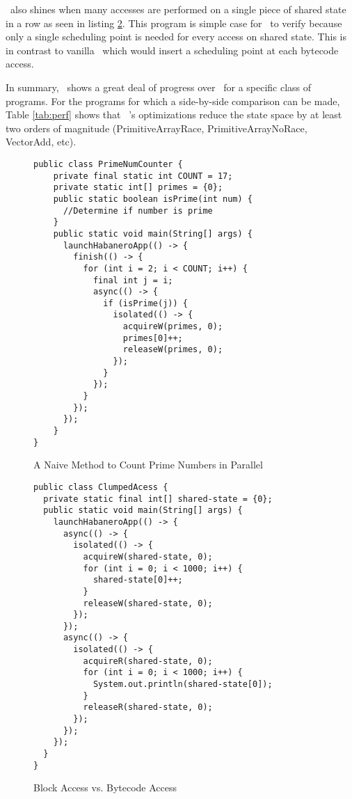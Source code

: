 \jpfhj\ also shines when many accesses are performed on a single piece of shared
state in a row as seen in listing \ref{lst:clumped}. This program is simple case
for \jpfhj\ to verify because only a single scheduling point is needed for every
access on shared state. This is in contrast to vanilla \jpf\ which would
insert a scheduling point at each bytecode access. 

In summary, \jpfhj\ shows a great deal of progress over \jpf\ for a specific
class of programs. For the programs for which a side-by-side comparison can be
made, Table \ref{tab:perf} shows that \jpfhj\ 's optimizations reduce the state
space by at least two orders of magnitude (PrimitiveArrayRace,
PrimitiveArrayNoRace, VectorAdd, etc).


\begin{figure}[t]
    \begin{center}
    \begin{lstlisting}
public class PrimeNumCounter {
    private final static int COUNT = 17;
    private static int[] primes = {0};
    public static boolean isPrime(int num) {
      //Determine if number is prime
    }
    public static void main(String[] args) {
      launchHabaneroApp(() -> {
        finish(() -> {
          for (int i = 2; i < COUNT; i++) {
            final int j = i;
            async(() -> {
              if (isPrime(j)) {
                isolated(() -> {
                  acquireW(primes, 0);
                  primes[0]++;
                  releaseW(primes, 0);
                });
              }
            });
          }
        });
      });
    }
}
    \end{lstlisting}
    \end{center}
    \caption{A Naive Method to Count Prime Numbers in Parallel}
    \label{lst:prime-num-counter}
\end{figure}

\begin{figure}[t]
    \begin{center}
    \begin{lstlisting}
public class ClumpedAcess {
  private static final int[] shared-state = {0};
  public static void main(String[] args) {
    launchHabaneroApp(() -> {
      async(() -> {
        isolated(() -> {
          acquireW(shared-state, 0);
          for (int i = 0; i < 1000; i++) {
            shared-state[0]++;
          }
          releaseW(shared-state, 0);
        });
      });
      async(() -> {
        isolated(() -> {
          acquireR(shared-state, 0);
          for (int i = 0; i < 1000; i++) {
            System.out.println(shared-state[0]);
          }
          releaseR(shared-state, 0);
        });
      });
    });
  }
}
    \end{lstlisting} 
    \end{center}
    \caption{Block Access vs. Bytecode Access}
    \label{lst:clumped}
\end{figure}

